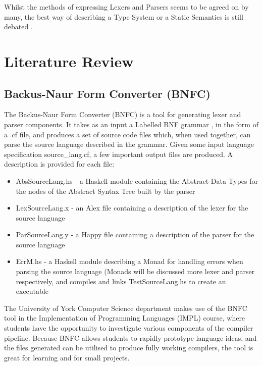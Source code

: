 \documentclass{UoYCSproject}
\begin{document}
Whilst the methods of expressing Lexers and Parsers seems to be agreed on by
many, the best way of describing a Type System or a Static Semantics is still
debated \cite{NeilJones}.

\chapter{Literature Review}

\section{Backus-Naur Form Converter (BNFC)}
\label{sec:BNFC}

The Backus-Naur Form Converter (BNFC) is a tool for generating lexer and parser
components. It takes as an input a Labelled BNF grammar \cite{LBNFReport},
in the form of a {\ttfamily .cf} file, and produces a set of source code files
which, when used together, can parse the source language described in the
grammar. Given some input language specification {\ttfamily source\_lang.cf},
a few important output files are produced. A description is provided for each
file:
\begin{itemize}
    \item {\ttfamily AbsSourceLang.hs} - a Haskell module containing the Abstract
        Data Types for the nodes of the Abstract Syntax Tree built by the
        parser
    \item {\ttfamily LexSourceLang.x} - an Alex file containing a description
        of the lexer for the source language
    \item {\ttfamily ParSourceLang.y} - a Happy file containing a description
        of the parser for the source language
    \item {\ttfamily ErrM.hs} - a Haskell module describing a Monad for handling
        errors when parsing the source language (Monads will be discussed more
        lexer and parser respectively, and compiles and links TestSourceLang.hs
        to create an executable
\end{itemize}

The University of York Computer Science department makes use of the BNFC tool
in the Implementation of Programming Languages (IMPL) course, where students
have the opportunity to investigate various components of the compiler pipeline.
Because BNFC allows students to rapidly prototype language ideas, and the files
generated can be utilised to produce fully working compilers, the tool is great
for learning and for small projects.
\end{document}
